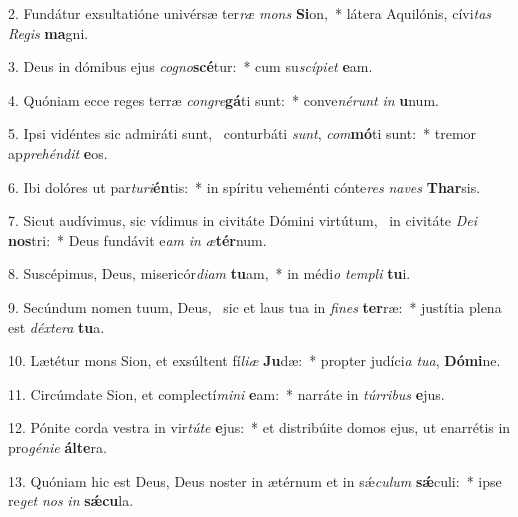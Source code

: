 2. Fundátur exsultatióne univérsæ ter\textit{ræ} \textit{mons} \textbf{Si}on,~*  látera Aquilónis, cívi\textit{tas} \textit{Re}\textit{gis} \textbf{ma}gni.\

3. Deus in dómibus ejus \textit{co}\textit{gno}\textbf{scé}tur:~*  cum su\textit{scí}\textit{pi}\textit{et} \textbf{e}am.\

4. Quóniam ecce reges terræ \textit{con}\textit{gre}\textbf{gá}ti sunt:~*  conve\textit{né}\textit{runt} \textit{in} \textbf{u}num.\

5. Ipsi vidéntes sic admiráti sunt, \dag\  conturbáti \textit{sunt}, \textit{com}\textbf{mó}ti sunt:~*  tremor ap\textit{pre}\textit{hén}\textit{dit} \textbf{e}os.\

6. Ibi dolóres ut par\textit{tu}\textit{ri}\textbf{én}tis:~*  in spíritu veheménti cónte\textit{res} \textit{na}\textit{ves} \textbf{Thar}sis.\

7. Sicut audívimus, sic vídimus in civitáte Dómini virtútum, \dag\  in civitáte \textit{De}\textit{i} \textbf{nos}tri:~*  Deus fundávit e\textit{am} \textit{in} \textit{æ}\textbf{tér}num.\

8. Suscépimus, Deus, misericór\textit{di}\textit{am} \textbf{tu}am,~*  in médi\textit{o} \textit{tem}\textit{pli} \textbf{tu}i.\

9. Secúndum nomen tuum, Deus, \dag\  sic et laus tua in \textit{fi}\textit{nes} \textbf{ter}ræ:~*  justítia plena est \textit{déx}\textit{te}\textit{ra} \textbf{tu}a.\

10. Lætétur mons Sion, et exsúltent fí\textit{li}\textit{æ} \textbf{Ju}dæ:~*  propter judíci\textit{a} \textit{tu}\textit{a}, \textbf{Dó}\textbf{mi}ne.\

11. Circúmdate Sion, et complectí\textit{mi}\textit{ni} \textbf{e}am:~*  narráte in \textit{túr}\textit{ri}\textit{bus} \textbf{e}jus.\

12. Pónite corda vestra in vir\textit{tú}\textit{te} \textbf{e}jus:~*  et distribúite domos ejus, ut enarrétis in pro\textit{gé}\textit{ni}\textit{e} \textbf{ál}\textbf{te}ra.\

13. Quóniam hic est Deus, Deus noster in ætérnum et in sǽ\textit{cu}\textit{lum} \textbf{sǽ}culi:~*  ipse re\textit{get} \textit{nos} \textit{in} \textbf{sǽ}\textbf{cu}la.\

